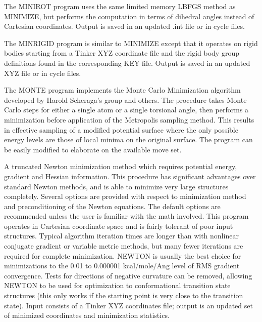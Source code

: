 \documentclass[letterpaper,11pt,english]{sphinxmanual}
\begin{document}

The MINIROT program uses the same limited memory L\sphinxhyphen{}BFGS method as MINIMIZE, but performs the computation in terms of dihedral angles instead of Cartesian coordinates. Output is saved in an updated .int file or in cycle files.


The MINRIGID program is similar to MINIMIZE except that it operates on rigid bodies starting from a Tinker XYZ coordinate file and the rigid body group definitions found in the corresponding KEY file. Output is saved in an updated XYZ file or in cycle files.


The MONTE program implements the Monte Carlo Minimization algorithm developed by Harold Scheraga’s group and others. The procedure takes Monte Carlo steps for either a single atom or a single torsional angle, then performs a minimization before application of the Metropolis sampling method. This results in effective sampling of a modified potential surface where the only possible energy levels are those of local minima on the original surface. The program can be easily modified to elaborate on the available move set.


A truncated Newton minimization method which requires potential energy, gradient and Hessian information. This procedure has significant advantages over standard Newton methods, and is able to minimize very large structures completely. Several options are provided with respect to minimization method and preconditioning of the Newton equations. The default options are recommended unless the user is familiar with the math involved. This program operates in Cartesian coordinate space and is fairly tolerant of poor input structures. Typical algorithm iteration times are longer than with nonlinear conjugate gradient or variable metric methods, but many fewer iterations are required for complete minimization. NEWTON is usually the best choice for minimizations to the 0.01 to 0.000001 kcal/mole/Ang level of RMS gradient convergence. Tests for directions of negative curvature can be removed, allowing NEWTON to be used for optimization to conformational transition state structures (this only works if the starting point is very close to the transition state). Input consists of a Tinker XYZ coordinates file; output is an updated set of minimized coordinates and minimization statistics.
\end{document}
